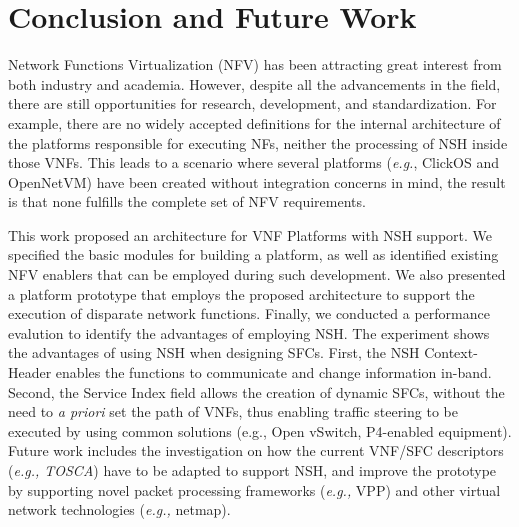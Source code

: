 \section{Conclusion and Future Work}

Network Functions Virtualization (NFV) has been attracting great interest from both industry and academia. However, despite all the advancements in the field, there are still opportunities for research, development, and standardization. For example, there are no widely accepted definitions for the internal architecture of the platforms responsible for executing NFs, neither the processing of NSH inside those VNFs. This leads to a scenario where several platforms (\textit{e.g.}, ClickOS and OpenNetVM) have been created without integration concerns in mind, the result is that none fulfills the complete set of NFV requirements.


This work proposed an architecture for VNF Platforms with NSH support. We specified the basic modules for building a platform, as well as identified existing NFV enablers that can be employed during such development. We also presented a platform prototype that employs the proposed architecture to support the execution of disparate network functions. Finally, we conducted a performance evalution to identify the advantages of employing NSH. The experiment shows the advantages of using NSH when designing SFCs. First, the NSH Context-Header enables the functions to communicate and change information in-band. Second, the Service Index field allows the creation of dynamic SFCs, without the need to \textit{a priori} set the path of VNFs, thus enabling traffic steering to be executed by using common solutions (e.g., Open vSwitch, P4-enabled equipment). Future work includes the investigation on how the current VNF/SFC descriptors (\textit{e.g., TOSCA}) have to be adapted to support NSH, and improve the prototype by supporting novel packet processing frameworks (\textit{e.g.,} VPP) and other virtual network technologies (\textit{e.g.,} netmap).

